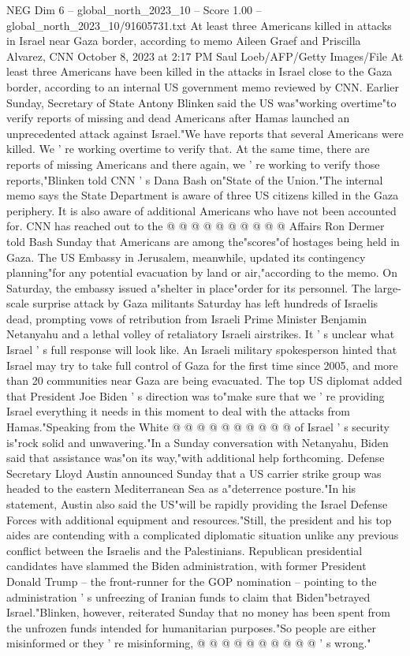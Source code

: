 \begin{textsample}{NEG Dim 6 – global\_north\_2023\_10 – Score 1.00 – global\_north\_2023\_10/91605731.txt}  \label{ex:f6_neg_200}
At least three Americans killed in attacks in Israel near Gaza border, according to memo Aileen Graef and Priscilla Alvarez, CNN October 8, 2023 at 2:17 PM Saul Loeb/AFP/Getty Images/File At least three Americans have been killed in the attacks in Israel close to the Gaza border, according to an internal US government memo reviewed by CNN.
Earlier Sunday, Secretary of State Antony Blinken said the US was"working overtime"to verify reports of missing and dead Americans after Hamas launched an unprecedented attack against Israel."We have reports that several Americans were killed.
We ' re working overtime to verify that.
At the same time, there are reports of missing Americans and there again, we ' re working to verify those reports,"Blinken told CNN ' s Dana Bash on"State of the Union."The internal memo says the State Department is aware of three US citizens killed in the Gaza periphery.
It is also aware of additional Americans who have not been accounted for.
CNN has reached out to the @ @ @ @ @ @ @ @ @ @ Affairs Ron Dermer told Bash Sunday that Americans are among the"scores"of hostages being held in Gaza.
The US Embassy in Jerusalem, meanwhile, updated its contingency planning"for any potential evacuation by land or air,"according to the memo.
On Saturday, the embassy issued a"shelter in place"order for its personnel.
The large-scale surprise attack by Gaza militants Saturday has left hundreds of Israelis dead, prompting vows of retribution from Israeli Prime Minister Benjamin Netanyahu and a lethal volley of retaliatory Israeli airstrikes.
It ' s unclear what Israel ' s full response will look like.
An Israeli military spokesperson hinted that Israel may try to take full control of Gaza for the first time since 2005, and more than 20 communities near Gaza are being evacuated.
The top US diplomat added that President Joe Biden ' s direction was to"make sure that we ' re providing Israel everything it needs in this moment to deal with the attacks from Hamas."Speaking from the White @ @ @ @ @ @ @ @ @ @ of Israel ' s security is"rock solid and unwavering."In a Sunday conversation with Netanyahu, Biden said that assistance was"on its way,"with additional help forthcoming.
Defense Secretary Lloyd Austin announced Sunday that a US carrier strike group was headed to the eastern Mediterranean Sea as a"deterrence posture."In his statement, Austin also said the US"will be rapidly providing the Israel Defense Forces with additional equipment and resources."Still, the president and his top aides are contending with a complicated diplomatic situation unlike any previous conflict between the Israelis and the Palestinians.
Republican presidential candidates have slammed the Biden administration, with former President Donald Trump -- the front-runner for the GOP nomination -- pointing to the administration ' s unfreezing of Iranian funds to claim that Biden"betrayed Israel."Blinken, however, reiterated Sunday that no money has been spent from the unfrozen funds intended for humanitarian purposes."So people are either misinformed or they ' re misinforming, @ @ @ @ @ @ @ @ @ @ ' s wrong."

\end{textsample}
